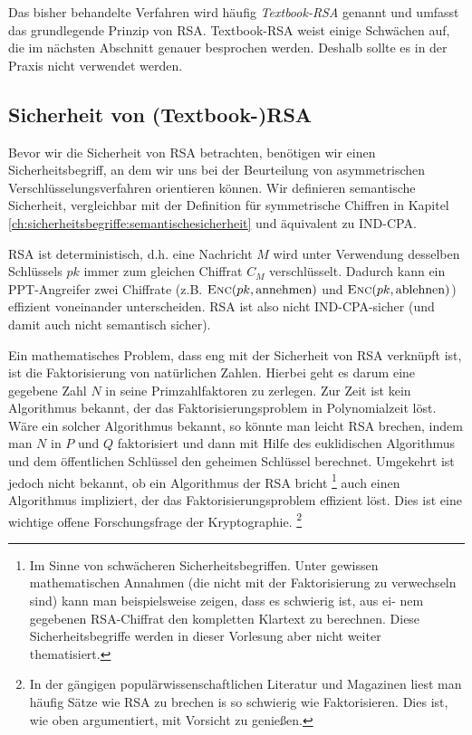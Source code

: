 Das bisher behandelte Verfahren wird häufig \textit{Textbook-RSA} genannt und
umfasst das grundlegende Prinzip von RSA. Textbook-RSA weist einige
Schwächen auf, die im nächsten Abschnitt genauer besprochen
werden. Deshalb sollte es in der Praxis nicht verwendet werden.

\subsection{Sicherheit von (Textbook-)RSA}
\label{ch:asymmenc:rsa:sicherheit}
Bevor wir die Sicherheit von RSA betrachten, benötigen wir einen Sicherheitsbegriff, an dem wir uns bei der Beurteilung von asymmetrischen
Verschlüsselungsverfahren orientieren können. Wir definieren semantische
Sicherheit, vergleichbar mit der Definition für symmetrische Chiffren in
Kapitel \ref{ch:sicherheitsbegriffe:semantischesicherheit} und
äquivalent zu IND-CPA. 

RSA ist deterministisch, d.h. eine Nachricht $M$ wird unter Verwendung
desselben Schlüssels $pk$ immer zum gleichen Chiffrat $C_M$
verschlüsselt. Dadurch kann ein PPT-Angreifer zwei Chiffrate (z.B. $\textsc{Enc}(pk, \text{annehmen})$ und $\textsc{Enc}(pk,
\text{ablehnen})$) effizient voneinander
unterscheiden. RSA ist also nicht IND-CPA-sicher (und damit auch
nicht semantisch sicher). 

Ein mathematisches Problem, dass eng mit der Sicherheit von RSA
verknüpft ist, ist die Faktorisierung von natürlichen Zahlen. Hierbei
geht es darum eine gegebene Zahl $N$ in seine Primzahlfaktoren zu
zerlegen. Zur Zeit ist kein Algorithmus bekannt, der das
Faktorisierungsproblem in Polynomialzeit löst. Wäre ein solcher
Algorithmus bekannt, so könnte man leicht RSA \glqq brechen\grqq , indem
man $N$ in $P$ und $Q$ faktorisiert und dann mit Hilfe des euklidischen
Algorithmus und dem öffentlichen Schlüssel den geheimen Schlüssel
berechnet. Umgekehrt ist jedoch nicht bekannt, ob ein Algorithmus der
RSA bricht \footnote{Im Sinne von schwächeren
Sicherheitsbegriffen. Unter gewissen mathematischen Annahmen (die nicht
mit der Faktorisierung zu verwechseln sind) kann man beispielsweise
zeigen, dass es schwierig ist, aus ei- nem gegebenen RSA-Chiffrat den
kompletten Klartext zu berechnen. Diese Sicherheitsbegriffe werden in
dieser Vorlesung aber nicht weiter thematisiert.} auch einen Algorithmus
impliziert, der das Faktorisierungsproblem effizient löst. Dies ist eine
wichtige offene Forschungsfrage der Kryptographie. \footnote{In der
gängigen populärwissenschaftlichen Literatur und Magazinen liest man
häufig Sätze wie \glqq RSA zu brechen is so schwierig wie
Faktorisieren\grqq. Dies ist, wie oben argumentiert, mit Vorsicht zu
genießen.}

